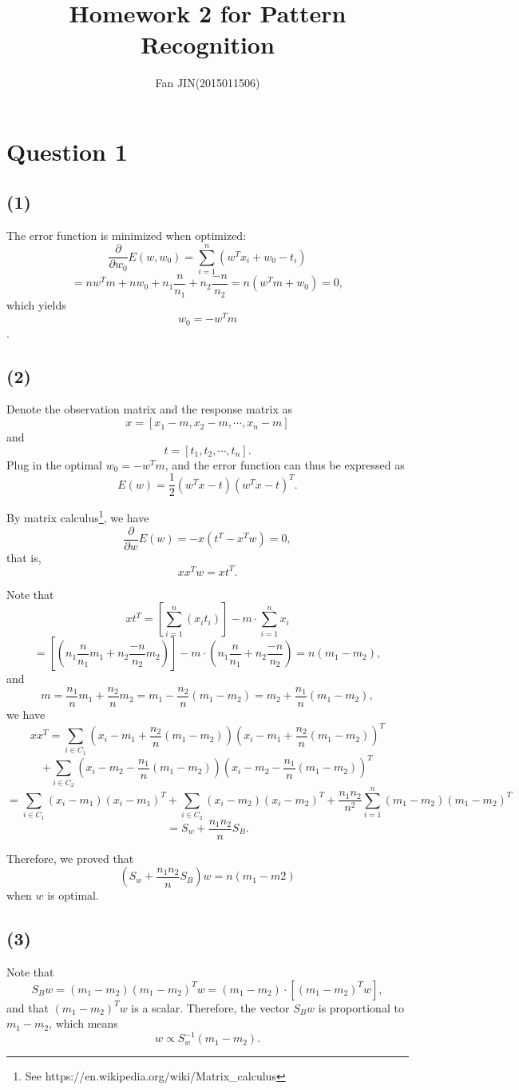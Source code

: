 \documentclass{article}
\begin{document}
\title{\textsf{Homework 2 for Pattern Recognition}}
\author{Fan JIN\quad (2015011506)}
\maketitle

\section*{Question 1}
{
    \subsection*{(1)}
    {
        The error function is minimized when optimized: 
        $$\frac{\partial}{\partial w_0} E(w, w_0) = \sum_{i=1}^{n} {(w^T x_i + w_0 - t_i)} $$
        $$= n w^T m + nw_0 + n_1 \frac{n}{n_1} + n_2 \frac{-n}{n_2} = n ( w^T m + w_0 ) = 0,$$
        which yields $$w_0 = -w^T m$$.
    }

    \subsection*{(2)}
    {
        Denote the observation matrix and the response matrix as 
        $$x = [x_1-m, x_2-m, \cdots, x_n-m]$$ and $$t = [t_1, t_2, \cdots, t_n].$$
        Plug in the optimal $w_0 = -w^T m$, and the error function can thus be expressed as 
        $$E(w) = \frac{1}{2} (w^T x - t)(w^T x - t)^T.$$

        By matrix calculus\footnote{See https://en.wikipedia.org/wiki/Matrix\_calculus}, we have
        $$\frac{\partial}{\partial w} E(w) = -x (t^T - x^T w) = 0,$$
        that is, $$x x^T w = x t^T.$$

        Note that $$x t^T = \left[ \sum_{i=1}^{n} {(x_i t_i)} \right] - m \cdot \sum_{i=1}^{n} {x_i} $$
        $$= \left[ \left(n_1 \frac{n}{n_1} m_1 + n_2 \frac{-n}{n_2} m_2 \right) \right] - m \cdot \left( n_1 \frac{n}{n_1} + n_2 \frac{-n}{n_2} \right) = n (m_1 - m_2),$$ and 
        $$m = \frac{n_1}{n}m_1 + \frac{n_2}{n}m_2 = m_1 - \frac{n_2}{n}(m_1-m_2) = m_2 + \frac{n_1}{n}(m_1-m_2),$$ we have
        $$x x^T = \sum_{i\in C_1}{(x_i - m_1 + \frac{n_2}{n}(m_1-m_2))(x_i - m_1 + \frac{n_2}{n}(m_1-m_2))^T} $$$$+ \sum_{i\in C_2}{(x_i - m_2 - \frac{n_1}{n}(m_1-m_2))(x_i - m_2 - \frac{n_1}{n}(m_1-m_2))^T}$$
        $$= \sum_{i\in C_1}{(x_i - m_1)(x_i - m_1)^T} + \sum_{i\in C_2}{(x_i - m_2)(x_i - m_2)^T} + \frac{n_1 n_2}{n^2} \sum_{i=1}^{n} {(m_1 - m_2)(m_1 - m_2)^T}$$
        $$= S_w + \frac{n_1 n_2}{n} S_B.$$

        Therefore, we proved that $$\left( S_w + \frac{n_1 n_2}{n} S_B \right) w = n (m_1 - m2)$$ when $w$ is optimal.

    }

    \subsection*{(3)}
    {
        Note that $$S_B w = (m_1 - m_2) (m_1 - m_2)^T w = (m_1 - m_2) \cdot \left[ (m_1 - m_2)^T w \right],$$ and that $(m_1 - m_2)^T w$ is a scalar. Therefore, the vector $S_B w$ is proportional to $m_1-m_2$, which means $$w \propto S_w^{-1} (m_1 - m_2).$$
    }
}
\end{document}

